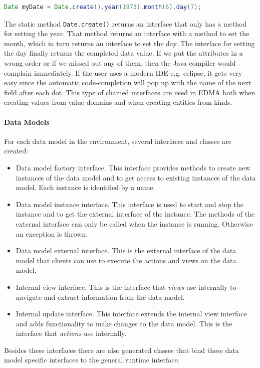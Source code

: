 \begin{lstlisting}[language=java,frame=none]
Date myDate = Date.create().year(1973).month(6).day(7);
\end{lstlisting}The static method \texttt{Date.create()} returns an interface that
only has a method for setting the year. That method returns an interface
with a method to set the month, which in turn returns an interface
to set the day. The interface for setting the day finally returns
the completed data value. If we put the attributes in a wrong order
or if we missed out any of them, then the Java compiler would complain
immediately. If the user uses a modern IDE e.g. eclipse, it gets very
easy since the automatic code-completion will pop up with the name
of the next field after each dot. This type of chained interfaces
are used in EDMA both when creating values from value domains and
when creating entities from kinds.


\paragraph{Data Models}

For each data model in the environment, several interfaces and classes
are created:
\begin{itemize}
\item Data model factory interface. This interface provides methods to create
new instances of the data model and to get access to existing instances
of the data model. Each instance is identified by a name.
\item Data model instance interface. This interface is used to start and
stop the instance and to get the external interface of the instance.
The methods of the external interface can only be called when the
instance is running. Otherwise an exception is thrown.
\item Data model external interface. This is the external interface of the
data model that clients can use to execute the actions and views on
the data model.
\item Internal view interface. This is the interface that \emph{views} use
internally to navigate and extract information from the data model.
\item Internal update interface. This interface extends the internal view
interface and adds functionality to make changes to the data model.
This is the interface that \emph{actions} use internally.
\end{itemize}
Besides these interfaces there are also generated classes that bind
these data model specific interfaces to the general runtime interface.


